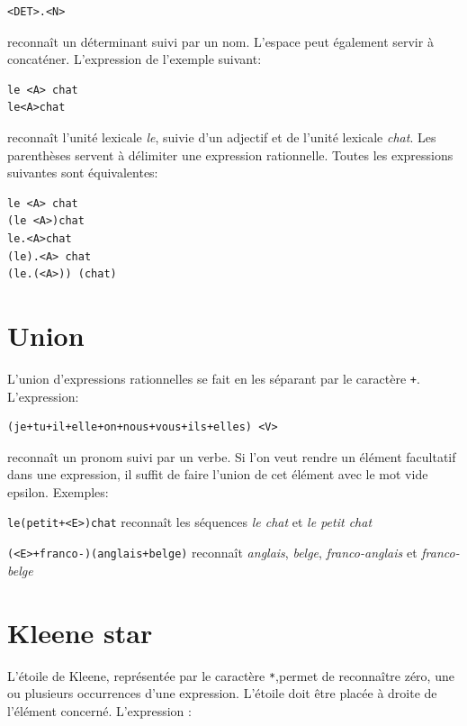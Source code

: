 \begin{verbatim}
<DET>.<N>
\end{verbatim}

\noindent reconnaît un déterminant suivi par un nom. L’espace peut également servir à concaténer.
L’expression de l’exemple suivant:


\begin{verbatim}
le <A> chat
le<A>chat
\end{verbatim}

\noindent reconnaît l’unité lexicale \textit{le}, suivie d’un adjectif et de l’unité lexicale \textit{chat}.
Les parenthèses  servent à délimiter une expression rationnelle.
Toutes les expressions suivantes sont équivalentes:


\begin{verbatim}
le <A> chat
(le <A>)chat
le.<A>chat
(le).<A> chat
(le.(<A>)) (chat)
\end{verbatim}

\section{Union}
\index{\verb$+$}
L’union d’expressions rationnelles se fait en les séparant par le caractère \verb$+$.
L’expression:

\begin{verbatim}
(je+tu+il+elle+on+nous+vous+ils+elles) <V>
\end{verbatim}

\noindent
reconnaît un pronom suivi par un verbe. Si l’on veut rendre un élément facultatif dans
une expression, il suffit de faire l’union de cet élément avec le mot vide epsilon.
 Exemples:

\bigskip
\noindent \verb$le(petit+<E>)chat$ reconnaît les séquences \textit{le chat}
et \textit{le petit chat}

\smallskip
\noindent \verb$(<E>+franco-)(anglais+belge)$ reconnaît \textit{anglais}, \textit{belge},
\textit{franco-anglais} et \textit{franco-belge}

\section{Kleene star}
\index{\verb+*+}
L’étoile de Kleene, représentée par le caractère \verb+*+,permet de reconnaître zéro, une ou
plusieurs occurrences d’une expression. L’étoile doit être placée à droite de l’élément concerné.
L’expression :



